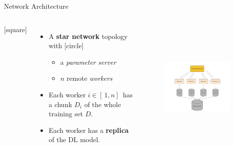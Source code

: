 \begin{frame}{Network Architecture}
    \begin{columns}
        [square]
        \begin{itemize}
            \item{A \textbf{star network} topology with
            [circle]
            \begin{itemize}
                \item a \emph{parameter server}
                \item $n$ remote \emph{workers}
            \end{itemize}}
            \vspace{0.2cm}
            \item{Each worker $i \in [\,1,n]\,$ has a chunk $D_i$ of the whole training set $D$.}
            \vspace{0.2cm}
            \item{Each worker has a \textbf{replica} of the DL model.}
        \end{itemize}
        \begin{figure}
            \includegraphics[width=8.5cm,height=6cm,center]{images/parameter-server.png}\label{fig:param-server}
        \end{figure}
    \end{columns}
\end{frame}

